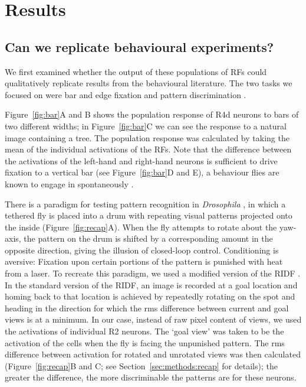 \section{Results}

\subsection*{Can we replicate behavioural experiments?}
We first examined whether the output of these populations of \acp{RF} could qualitatively replicate results from the behavioural literature.
The two tasks we focused on were bar and edge fixation \cite{Neuser2008,Osorio1990} and pattern discrimination \cite{Liu2006,Ernst1999}.

Figure~\ref{fig:bar}A and B shows the population response of R4d neurons to bars of two different widths; in Figure~\ref{fig:bar}C we can see the response to a natural image containing a tree.
The population response was calculated by taking the mean of the individual activations of the \acp{RF}.
Note that the difference between the activations of the left-hand and right-hand neurons is sufficient to drive fixation to a vertical bar (see Figure~\ref{fig:bar}D and E), a behaviour flies are known to engage in spontaneously \cite{Reichardt1969}.

There is a paradigm for testing pattern recognition in \emph{Drosophila} \cite{Pan2009,Liu2006,Ernst1999}, in which a tethered fly is placed into a drum with repeating visual patterns projected onto the inside (Figure~\ref{fig:recap}A).
When the fly attempts to rotate about the yaw-axis, the pattern on the drum is shifted by a corresponding amount in the opposite direction, giving the illusion of closed-loop control.
Conditioning is aversive: Fixation upon certain portions of the pattern is punished with heat from a laser.
To recreate this paradigm, we used a modified version of the \ac{RIDF} \cite{Philippides2011,Zeil2003}.
In the standard version of the \ac{RIDF}, an image is recorded at a goal location and homing back to that location is achieved by repeatedly rotating on the spot and heading in the direction for which the \ac{rms} difference between current and goal views is at a minimum.
In our case, instead of raw pixel content of views, we used the activations of individual R2 neurons.
The `goal view' was taken to be the activation of the cells when the fly is facing the unpunished pattern.
The \ac{rms} difference between activation for rotated and unrotated views was then calculated (Figure~\ref{fig:recap}B and C; see Section~\ref{sec:methods:recap} for details); the greater the difference, the more discriminable the patterns are for these neurons.

